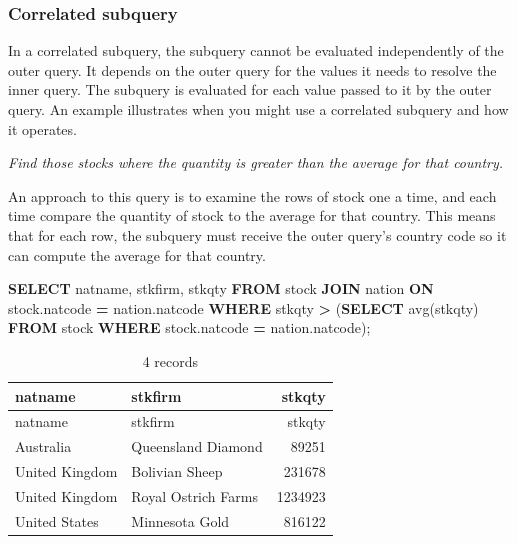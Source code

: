 \documentclass[
]{article}
\newenvironment{Shaded}{\begin{snugshade}}{\end{snugshade}}
\newcommand{\FunctionTok}[1]{\textcolor[rgb]{0.00,0.00,0.00}{#1}}
\newcommand{\KeywordTok}[1]{\textcolor[rgb]{0.13,0.29,0.53}{\textbf{#1}}}
\newcommand{\NormalTok}[1]{#1}
\newcommand{\OperatorTok}[1]{\textcolor[rgb]{0.81,0.36,0.00}{\textbf{#1}}}
\begin{document}
\hypertarget{correlated-subquery}{%
\subsubsection{Correlated subquery}\label{correlated-subquery}}

In a correlated subquery, the subquery cannot be evaluated independently
of the outer query. It depends on the outer query for the values it
needs to resolve the inner query. The subquery is evaluated for each
value passed to it by the outer query. An example illustrates when you
might use a correlated subquery and how it operates.

\emph{Find those stocks where the quantity is greater than the average
for that country.}

An approach to this query is to examine the rows of stock one a time,
and each time compare the quantity of stock to the average for that
country. This means that for each row, the subquery must receive the
outer query's country code so it can compute the average for that
country.

\begin{Shaded}
\begin{Highlighting}[]
\KeywordTok{SELECT}\NormalTok{ natname, stkfirm, stkqty }\KeywordTok{FROM}\NormalTok{ stock }\KeywordTok{JOIN}\NormalTok{ nation}
    \KeywordTok{ON}\NormalTok{ stock.natcode }\OperatorTok{=}\NormalTok{ nation.natcode}
    \KeywordTok{WHERE}\NormalTok{ stkqty }\OperatorTok{\textgreater{}}
\NormalTok{        (}\KeywordTok{SELECT} \FunctionTok{avg}\NormalTok{(stkqty) }\KeywordTok{FROM}\NormalTok{ stock}
            \KeywordTok{WHERE}\NormalTok{ stock.natcode }\OperatorTok{=}\NormalTok{ nation.natcode);}
\end{Highlighting}
\end{Shaded}

\begin{longtable}[]{@{}llr@{}}
\caption{4 records}\tabularnewline
\toprule()
natname & stkfirm & stkqty \\
\midrule()
\endfirsthead
\toprule()
natname & stkfirm & stkqty \\
\midrule()
\endhead
Australia & Queensland Diamond & 89251 \\
United Kingdom & Bolivian Sheep & 231678 \\
United Kingdom & Royal Ostrich Farms & 1234923 \\
United States & Minnesota Gold & 816122 \\
\bottomrule()
\end{longtable}
\end{document}
